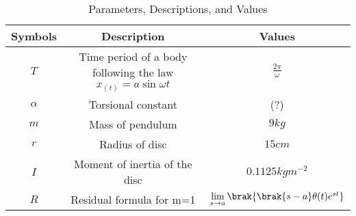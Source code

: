 \begin{table}[ht!]
\centering
\begin{tabular}{ |c|c|c| } 
 \hline
Symbols & Description & Values  \\
\hline
 $T$ & Time period of a body following the law $x_{(t)} = a\sin{\omega t}$ &$\frac{2\pi}{\omega}$\\
 \hline
 $\alpha$ & Torsional constant & (?)\\
 \hline
 $m$ & Mass of pendulum & $9kg$\\
 \hline
 $r$& Radius of disc & $15cm$\\
 \hline
 $I$ & Moment of inertia of the disc & $0.1125kgm^{-2}$\\
 \hline
 $R$ & Residual formula for m=1 &  $\lim\limits_{s\to a}\brak {{\brak{s-a}}\theta(t)e^{st}}$\\
\hline
\end{tabular}
\caption{Parameters, Descriptions, and Values}
\label{table:ee25-analog}
\end{table}



